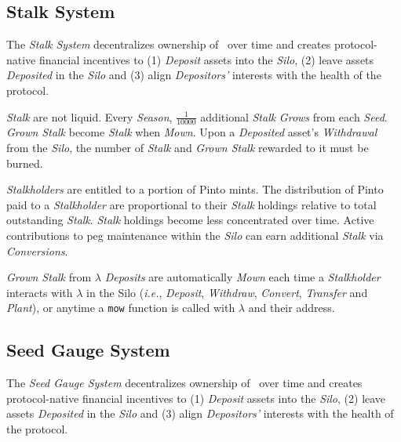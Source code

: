 \documentclass[tikz]{article}
\newcommand{\code}[1]{\texttt{#1}}
\newcommand{\term}[1]{\textsl{#1}}
\newcommand{\Pinto}{} %
\begin{document}

\vspace*{-1.35mm}
\subsection{Stalk System}
\vspace*{-1.35mm}

The \term{Stalk System} decentralizes ownership of \Pinto\ over time and creates protocol-native financial incentives to (1) \term{Deposit} assets into the \term{Silo}, (2) leave assets \term{Deposited} in the \term{Silo} and (3) align \term{Depositors'} interests with the health of the protocol.

\term{Stalk} are not liquid. Every \term{Season}, $\frac{1}{10000}$ additional \term{Stalk} \term{Grows} from each \term{Seed}. \term{Grown Stalk} become \term{Stalk} when \term{Mown}. Upon a \term{Deposited} asset's \term{Withdrawal} from the \term{Silo}, the number of \term{Stalk} and \term{Grown Stalk} rewarded to it must be burned.

\term{Stalkholders} are entitled to a portion of Pinto mints. The distribution of Pinto paid to a \term{Stalkholder} are proportional to their \term{Stalk} holdings relative to total outstanding \term{Stalk}. \term{Stalk} holdings become less concentrated over time. Active contributions to peg maintenance within the \term{Silo} can earn additional \term{Stalk} via \term{Conversions}.
 
\term{Grown Stalk} from $\lambda$ \term{Deposits} are automatically \term{Mown} each time a \term{Stalkholder} interacts with $\lambda$ in the Silo (\textit{i.e.}, \term{Deposit}, \term{Withdraw}, \term{Convert}, \term{Transfer} and \term{Plant}), or anytime a \code{mow} function is called with $\lambda$ and their address.


\vspace*{-1.35mm}
\subsection{Seed Gauge System}
\vspace*{-1.35mm}

The \term{Seed Gauge System} decentralizes ownership of \Pinto\ over time and creates protocol-native financial incentives to (1) \term{Deposit} assets into the \term{Silo}, (2) leave assets \term{Deposited} in the \term{Silo} and (3) align \term{Depositors'} interests with the health of the protocol.
\end{document}
